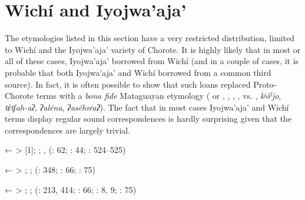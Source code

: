 \section{Wichí and Iyojwa’aja’} \label{wiijw}

\begin{adjustwidth}{6mm}{0pt}
The etymologies listed in this section have a very restricted distribution, limited to Wichí and the Iyojwa’aja’ variety of Chorote. It is highly likely that in most or all of these cases, Iyojwa’aja’ borrowed from Wichí (and in a couple of cases, it is probable that both Iyojwa’aja’ and Wichí borrowed from a common third source). In fact, it is often possible to show that such loans replaced Proto-Chorote terms with a \textit{bona fide} Mataguayan etymology ( or , , , ,  vs. , \textit{kʲóˀjo}, \textit{tέtʃah\mbox{-}aʔ}, \textit{ʔaléna}, \textit{ʔaséhnʲaʔ}). The fact that in most cases Iyojwa’aja’ and Wichí terms display regular sound correspondences is hardly surprising given that the correspondences are largely trivial.


←  >  [1]; ; ,  (\citealt{JB09}: 62; \citealt{MG-MELO15}: 44; \citealt{KC16}: 524–525)



←  > ; ;  (\citealt{VN14}: 348; \citealt{VU74}: 66; \citealt{KC16}: 75)



←  > ; ;  (\citealt{VN14}: 213, 414; \citealt{VU74}: 66; \citealt{MG-MELO15}: 8, 9; \citealt{KC16}: 75)


\end{adjustwidth}
